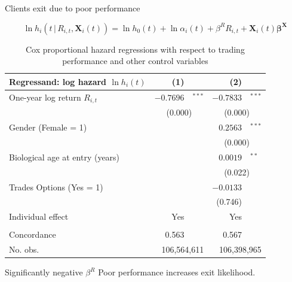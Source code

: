 \documentclass{beamer}
\begin{document}
\begin{frame}{Clients exit due to poor performance}

	\begin{equation}
	\label{eq:rregress}
\ln h_i(t \,|\, R_{i,t},\bm{X}_i(t)) = \ln h_{0}(t) + \ln \alpha_i(t) + \beta^R R_{i,t} + \bm{X}_i(t) \bm{\beta}^{\bm{X}}
	\end{equation}

	\begin{table}[h!]
		\centering
		\caption{Cox proportional hazard regressions with respect to trading performance and other control variables}
		\tiny
		\setlength{\tabcolsep}{2pt}
    \begin{tabular}{@{}lr@{}lr@{}l@{}}
	\toprule
	Regressand: log hazard $\ln h_i(t)$    & (1)& & (2)& \\ \midrule
	One-year log return $R_{i,t}$ & $-0.7696$ & $^{***}$ & $-0.7833$ & $^{***}$ \\
	& \multicolumn{2}{c}{(0.000)} & \multicolumn{2}{c}{(0.000)} \\
	Gender (Female = 1) &       & \multicolumn{1}{l}{} & $0.2563$ & $^{***}$ \\
	& \multicolumn{2}{r}{} & \multicolumn{2}{c}{(0.000)} \\
	Biological age at entry (years) &       & \multicolumn{1}{l}{} & $0.0019$ & $^{**}$ \\
	& \multicolumn{2}{r}{} & \multicolumn{2}{c}{(0.022)} \\
	Trades Options (Yes = 1) &       & \multicolumn{1}{l}{} & $-0.0133$ &  \\
	& & & (0.746) & \\
	Individual effect & Yes   &       & Yes   &  \\
	&       &       &       &  \\
	Concordance & 0.563 &       & 0.567 &  \\
	No. obs.   & \multicolumn{2}{r}{ 106,564,611 } & \multicolumn{2}{r}{ 106,398,965 } \\
	\bottomrule
\end{tabular}
		\label{tab:regressrank}
	\end{table}%

\begin{block}{Significantly negative $\beta^R$}
Poor performance increases exit likelihood.
\end{block}

\end{frame}
\end{document}
